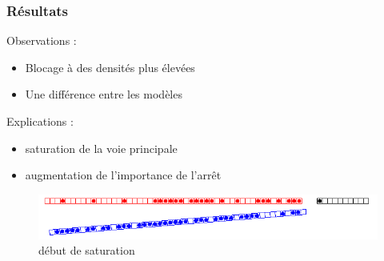 \documentclass[slidetop,11pt]{beamer}
\begin{document}
\begin{frame}
	\frametitle{Résultats}
	Observations :
		\begin{itemize}
			 \item Blocage à des densités plus élevées
			 \item Une différence entre les modèles
		\end{itemize}
	Explications :
		\begin{itemize}
			\item saturation de la voie principale
			\item augmentation de l'importance de l’arrêt
		\end{itemize}
	\begin{figure}
		\begin{center}
			\includegraphics[scale=0.4]{./images/localsature}
		\end{center}
		\caption{début de saturation}
	\end{figure}
\end{frame}
\end{document}
